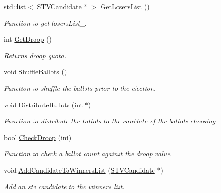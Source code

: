 \begin{DoxyCompactItemize}
\mbox{\label{classSTVElectionRecord_affc79a53b8fa74a8d7a65ae92b256387}} 
std\+::list$<$ \hyperlink{classSTVCandidate}{S\+T\+V\+Candidate} $\ast$ $>$ \hyperlink{classSTVElectionRecord_affc79a53b8fa74a8d7a65ae92b256387}{Get\+Losers\+List} ()
\begin{DoxyCompactList}\small\item\em Function to get losers\+List\+\_\+. \end{DoxyCompactList}\item 
int \hyperlink{classSTVElectionRecord_aa954f6081a250962261e63a7497c1eb4}{Get\+Droop} ()
\begin{DoxyCompactList}\small\item\em Returns droop quota. \end{DoxyCompactList}\item 
\mbox{\label{classSTVElectionRecord_a9f0c214158ad1d590db5f0ac3712c4ef}} 
void \hyperlink{classSTVElectionRecord_a9f0c214158ad1d590db5f0ac3712c4ef}{Shuffle\+Ballots} ()
\begin{DoxyCompactList}\small\item\em Function to shuffle the ballots prior to the election. \end{DoxyCompactList}\item 
\mbox{\label{classSTVElectionRecord_a0fb9749e08613f0024656a3b55b9ec3f}} 
void \hyperlink{classSTVElectionRecord_a0fb9749e08613f0024656a3b55b9ec3f}{Distribute\+Ballots} (int $\ast$)
\begin{DoxyCompactList}\small\item\em Function to distribute the ballots to the canidate of the ballots choosing. \end{DoxyCompactList}\item 
bool \hyperlink{classSTVElectionRecord_ab941d3821a34ef527128042500c416c7}{Check\+Droop} (int)
\begin{DoxyCompactList}\small\item\em Function to check a ballot count against the droop value. \end{DoxyCompactList}\item 
void \hyperlink{classSTVElectionRecord_af466fd6edc790d7744fe809e7ee9d40c}{Add\+Candidate\+To\+Winners\+List} (\hyperlink{classSTVCandidate}{S\+T\+V\+Candidate} $\ast$)
\begin{DoxyCompactList}\small\item\em Add an stv candidate to the winners list. \end{DoxyCompactList}\item 

\end{DoxyCompactItemize}
